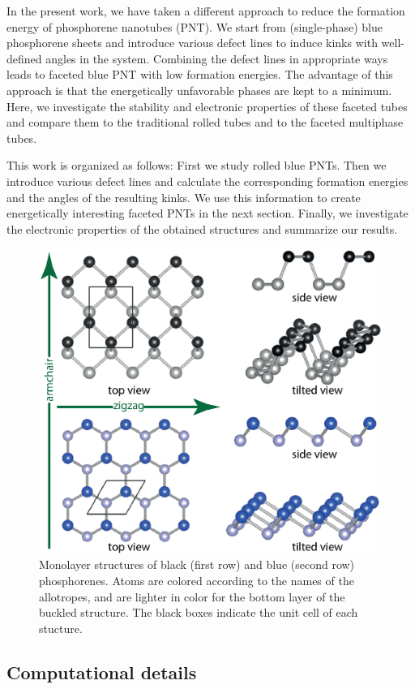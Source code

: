 In the present work, we have taken a different approach to reduce the formation energy of phosphorene nanotubes (PNT). We start from (single-phase) blue phosphorene sheets and introduce various defect lines to induce kinks with well-defined angles in the system. Combining the defect lines in appropriate ways leads to faceted blue PNT with low formation energies. The advantage of this approach is that the energetically unfavorable phases are kept to a minimum. Here, we investigate the stability and electronic properties of these faceted tubes and compare them to the traditional rolled tubes and to the faceted multiphase tubes. 

This work is organized as follows: First we study rolled blue PNTs. Then we introduce various defect lines and calculate the corresponding formation energies and the angles of the resulting kinks. We use this information to create energetically interesting faceted PNTs in the next section. Finally, we investigate the electronic properties of the obtained structures and summarize our results.


\begin{figure}[htbp]
\centering
\includegraphics[width=0.7\linewidth]{Nanotu_monolayer_structures.eps}%
\caption{Monolayer structures of black (first row) and blue (second row) phosphorenes. Atoms are colored according to the names of the allotropes, and are lighter in color for the bottom layer of the buckled structure. The black boxes indicate the unit cell of each stucture. \label{natu_monolayer}}
\end{figure}

\subsection{Computational details}

